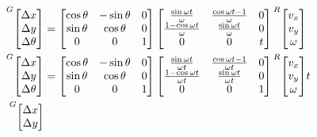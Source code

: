 \begin{align}
  \crdfrm{G}{\begin{bmatrix}
    \Delta x \\
    \Delta y \\
    \Delta \theta
  \end{bmatrix}} &=
  \begin{bmatrix}
    \cos\theta & -\sin\theta & 0 \\
    \sin\theta &  \cos\theta & 0 \\
             0 &           0 & 1
  \end{bmatrix}
  \begin{bmatrix}
    \frac{\sin\omega t}{\omega} & \frac{\cos\omega t - 1}{\omega} & 0 \\
    \frac{1 - \cos\omega t}{\omega} & \frac{\sin\omega t}{\omega} & 0 \\
    0 & 0 & t
  \end{bmatrix}
  \crdfrm{R}{\begin{bmatrix}
    v_x \\
    v_y \\
    \omega
  \end{bmatrix}} \nonumber \\
  \crdfrm{G}{\begin{bmatrix}
    \Delta x \\
    \Delta y \\
    \Delta \theta
  \end{bmatrix}} &=
  \begin{bmatrix}
    \cos\theta & -\sin\theta & 0 \\
    \sin\theta &  \cos\theta & 0 \\
             0 &           0 & 1
  \end{bmatrix}
  \begin{bmatrix}
    \frac{\sin\omega t}{\omega t} & \frac{\cos\omega t - 1}{\omega t} & 0 \\
    \frac{1 - \cos\omega t}{\omega t} & \frac{\sin\omega t}{\omega t} & 0 \\
    0 & 0 & 1
  \end{bmatrix}
  \crdfrm{R}{\begin{bmatrix}
    v_x \\
    v_y \\
    \omega
  \end{bmatrix}} t \nonumber \\
  \crdfrm{G}{\begin{bmatrix}
    \Delta x \\
    \Delta y \\

\end{bmatrix}}
\end{align}
